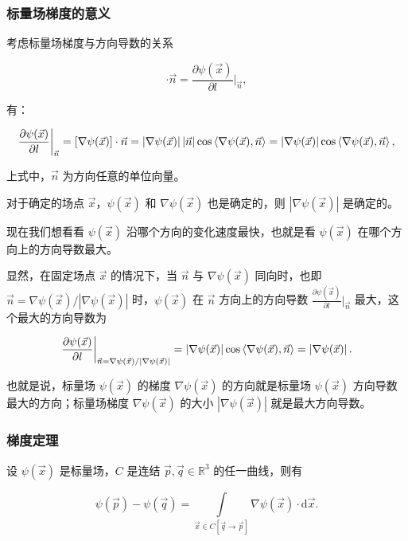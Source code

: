 \subsubsection{标量场梯度的意义}

考虑标量场梯度与方向导数的关系

\begin{equation}
[\nabla\psi(\vec{x})] \cdot \vec{n}
=\frac{\partial \psi(\vec{x}) }{\partial l }\bigg|_{\vec{n}},
\end{equation}

有：

\begin{equation}
\frac{\partial \psi(\vec{x}) }{\partial l }\bigg|_{\vec{n}}
=[\nabla\psi(\vec{x})] \cdot \vec{n}
=\left|\nabla\psi(\vec{x}) \right| \left|\vec{n} \right| \cos\Braket{\nabla\psi(\vec{x}) , \vec{n} }
=\left|\nabla\psi(\vec{x}) \right| \cos\Braket{\nabla\psi(\vec{x}) , \vec{n} },
\end{equation}

上式中，$\vec{n} $ 为方向任意的单位向量。

对于确定的场点 $\vec{x} $，$\psi(\vec{x}) $ 和 $\nabla\psi(\vec{x}) $ 也是确定的，则 $\left|\nabla \psi(\vec{x}) \right| $ 是确定的。

现在我们想看看 $\psi(\vec{x}) $ 沿哪个方向的变化速度最快，也就是看 $\psi(\vec{x}) $ 在哪个方向上的方向导数最大。

显然，在固定场点 $\vec{x} $ 的情况下，当 $\vec{n} $ 与 $\nabla \psi(\vec{x}) $ 同向时，也即 $\vec{n}=\nabla\psi(\vec{x})/\left|\nabla\psi(\vec{x}) \right| $ 时，$\psi(\vec{x}) $ 在 $\vec{n} $ 方向上的方向导数 $\displaystyle{\frac{\partial \psi(\vec{x}) }{\partial l }\bigg|_{\vec{n}} }$ 最大，这个最大的方向导数为

$$
\frac{\partial \psi(\vec{x}) }{\partial l }\bigg|_{\vec{n}=\nabla\psi(\vec{x})/\left|\nabla\psi(\vec{x}) \right|}
=\left|\nabla\psi(\vec{x}) \right| \cos\Braket{\nabla\psi(\vec{x}) , \vec{n} }
=\left|\nabla\psi(\vec{x}) \right|.
$$

也就是说，标量场 $\psi(\vec{x}) $ 的梯度 $\nabla \psi(\vec{x}) $ 的方向就是标量场 $\psi(\vec{x}) $ 方向导数最大的方向；标量场梯度 $\nabla \psi(\vec{x}) $ 的大小 $\left|\nabla \psi(\vec{x}) \right| $ 就是最大方向导数。

\subsubsection{梯度定理}

\begin{theorem}
设 $\psi(\vec{x}) $ 是标量场，$C $ 是连结 $\vec{p},\vec{q}\in \mathbb{R}^3 $ 的任一曲线，则有

\begin{equation}
\psi\left(\vec{p} \right) - \psi\left(\vec{q} \right)
=\int\limits_{\vec{x}\in C[\vec{q}\to \vec{p}]} \nabla \psi(\vec{x}) \cdot \mathrm{d}\vec{x}.
\end{equation}
\end{theorem}

